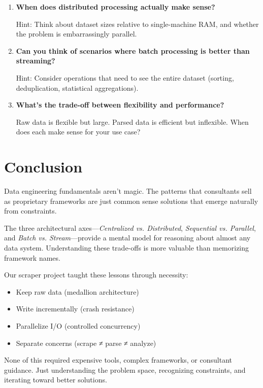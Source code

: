 \documentclass[11pt,a4paper]{article}
\begin{document}
\begin{enumerate}
    \item \textbf{When does distributed processing actually make sense?}

    Hint: Think about dataset sizes relative to single-machine RAM, and whether the problem is embarrassingly parallel.

    \item \textbf{Can you think of scenarios where batch processing is better than streaming?}

    Hint: Consider operations that need to see the entire dataset (sorting, deduplication, statistical aggregations).

    \item \textbf{What's the trade-off between flexibility and performance?}

    Raw data is flexible but large. Parsed data is efficient but inflexible. When does each make sense for your use case?
\end{enumerate}

\section{Conclusion}

Data engineering fundamentals aren't magic. The patterns that consultants sell as proprietary frameworks are just common sense solutions that emerge naturally from constraints.

The three architectural axes—\textit{Centralized vs. Distributed}, \textit{Sequential vs. Parallel}, and \textit{Batch vs. Stream}—provide a mental model for reasoning about almost any data system. Understanding these trade-offs is more valuable than memorizing framework names.

Our scraper project taught these lessons through necessity:

\begin{itemize}
    \item Keep raw data (medallion architecture)
    \item Write incrementally (crash resistance)
    \item Parallelize I/O (controlled concurrency)
    \item Separate concerns (scrape ≠ parse ≠ analyze)
\end{itemize}

None of this required expensive tools, complex frameworks, or consultant guidance. Just understanding the problem space, recognizing constraints, and iterating toward better solutions.
\end{document}
